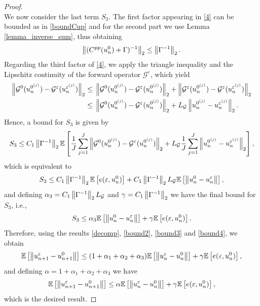 \documentclass[10pt]{article}
\begin{document}
\begin{proof}
\begin{equation}
\end{equation}
We now consider the last term $S_3$. The first factor appearing in \eqref{4} can be bounded as in \eqref{boundCup} and for the second part we use Lemma \ref{lemma_inverse_sum}, thus obtaining
\begin{equation*}
\left\|(C^{pp}(u_n^0) + \Gamma)^{-1}\right\|_2 \le \left\|\Gamma^{-1}\right\|_2.
\end{equation*}
Regarding the third factor of \eqref{4}, we apply the triangle inequality and the Lipschitz continuity of the forward operator $\mathcal{G}^{\varepsilon}$, which yield
\begin{align*}
\left\|\mathcal{G}^0(u_n^{0^{(j)}}) - \mathcal{G}^{\varepsilon}(u_n^{\varepsilon^{(j)}})\right\|_2 \le & \; \left\|\mathcal{G}^0(u_n^{0^{(j)}}) - \mathcal{G}^{\varepsilon}(u_n^{0^{(j)}})\right\|_2 + \left\|\mathcal{G}^{\varepsilon}(u_n^{0^{(j)}}) - \mathcal{G}^{\varepsilon}(u_n^{\varepsilon^{(j)}})\right\|_2 \\
\le & \; \left\|\mathcal{G}^0(u_n^{0^{(j)}}) - \mathcal{G}^{\varepsilon}(u_n^{0^{(j)}})\right\|_2 + L_{\mathcal{G}} \left\|u_n^{0^{(j)}} - u_n^{\varepsilon^{(j)}}\right\|_2.
\end{align*}
Hence, a bound for $S_3$ is given by
\begin{equation*}
S_3 \leq C_1 \left\|\Gamma^{-1}\right\|_2 \mathbb{E} \left [ \frac{1}{J} \sum_{j=1}^J \left\|\mathcal{G}^0(u_n^{0^{(j)}}) - \mathcal{G}^{\varepsilon}(u_n^{0^{(j)}})\right\|_2 + L_{\mathcal{G}} \frac{1}{J} \sum_{j=1}^J \left\|u_n^{0^{(j)}} - u_n^{\varepsilon^{(j)}}\right\|_2 \right ],
\end{equation*}
which is equivalent to
\begin{equation*}
S_3 \leq C_1 \left\|\Gamma^{-1}\right\|_2 \mathbb{E} \left [ e(\varepsilon, u_n^0) \right ] + C_1 \left\|\Gamma^{-1}\right\|_2 L_{\mathcal{G}} \mathbb{E} \left [ \left\|u_n^0 - u_n^{\varepsilon}\right\| \right ],
\end{equation*}
and defining $\alpha_3 = C_1 \left\|\Gamma^{-1}\right\|_2 L_{\mathcal{G}}$ and $\gamma = C_1 \left\|\Gamma^{-1}\right\|_2$ we have the final bound for $S_3$, i.e.,
\begin{equation}
\label{bound4}
S_3 \leq \alpha_3 \mathbb{E} \left [ \left\|u_n^0 - u_n^{\varepsilon}\right\| \right ] + \gamma \mathbb{E} \left [ e(\varepsilon, u_n^0) \right ].
\end{equation}
Therefore, using the results \eqref{decomp}, \eqref{bound2}, \eqref{bound3} and \eqref{bound4}, we obtain
\begin{equation*}
\mathbb{E} \left [ \left\|u_{n+1}^{\varepsilon} - u_{n+1}^0\right\| \right ] \le (1 + \alpha_1 + \alpha_2 + \alpha_3) \mathbb{E} \left [ \left\|u_n^{\varepsilon} - u_n^0\right\| \right ] + \gamma \mathbb{E} \left [ e(\varepsilon, u_n^0) \right ],
\end{equation*}
and defining $\alpha = 1 + \alpha_1 + \alpha_2 + \alpha_3$ we have
\begin{equation}
\label{induction}
\mathbb{E} \left [ \left\|u_{n+1}^{\varepsilon} - u_{n+1}^0\right\| \right ] \le \alpha \mathbb{E} \left [ \left\|u_n^{\varepsilon} - u_n^0\right\| \right ] + \gamma \mathbb{E} \left [ e(\varepsilon, u_n^0) \right ],
\end{equation}
which is the desired result.
\end{proof}
\end{document}
